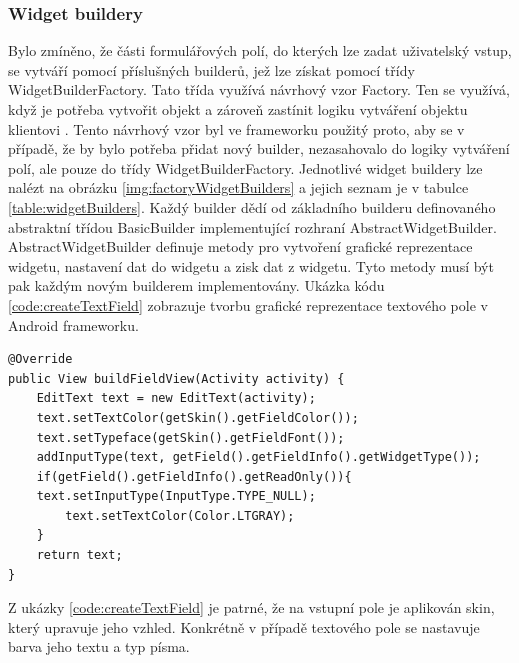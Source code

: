 \subsubsection{Widget buildery}
Bylo zmíněno, že části formulářových polí, do kterých lze zadat uživatelský vstup, se vytváří pomocí příslušných builderů, jež lze získat pomocí třídy WidgetBuilderFactory. Tato třída využívá návrhový vzor Factory. Ten se využívá, když je potřeba vytvořit objekt a zároveň zastínit logiku vytváření objektu klientovi \cite{factorypattern}. Tento návrhový vzor byl ve frameworku použitý proto, aby se v případě, že by bylo potřeba přidat nový builder, nezasahovalo do logiky vytváření polí, ale pouze do třídy WidgetBuilderFactory. Jednotlivé widget buildery lze nalézt na obrázku \ref{img:factoryWidgetBuilders} a jejich seznam je v tabulce \ref{table:widgetBuilders}. Každý builder dědí od základního builderu definovaného abstraktní třídou BasicBuilder implementující rozhraní AbstractWidgetBuilder. AbstractWidgetBuilder definuje metody pro vytvoření grafické reprezentace widgetu, nastavení dat do widgetu a zisk dat z widgetu. Tyto metody musí být pak každým novým builderem implementovány. Ukázka kódu \ref{code:createTextField} zobrazuje tvorbu grafické reprezentace textového pole v Android frameworku.

\begin{lstlisting}[caption=Ukázka tvorby grafické reprezentace textového pole,
label={code:createTextField}, basicstyle=\footnotesize]
@Override
public View buildFieldView(Activity activity) {
    EditText text = new EditText(activity);
    text.setTextColor(getSkin().getFieldColor());
    text.setTypeface(getSkin().getFieldFont());
    addInputType(text, getField().getFieldInfo().getWidgetType());
    if(getField().getFieldInfo().getReadOnly()){
	text.setInputType(InputType.TYPE_NULL);
        text.setTextColor(Color.LTGRAY);
    }
    return text;
}
\end{lstlisting} 

Z ukázky \ref{code:createTextField} je patrné, že na vstupní pole je aplikován skin, který upravuje jeho vzhled. Konkrétně v případě textového pole se nastavuje barva jeho textu a typ písma.

